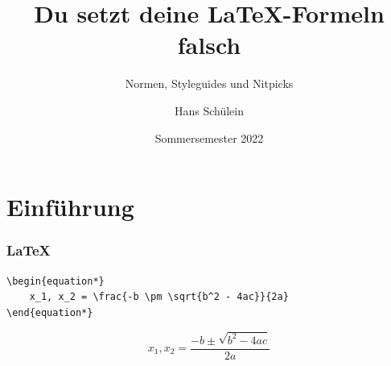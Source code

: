 \documentclass[handout]{beamer}
\begin{document}
\title{Du setzt deine \LaTeX-Formeln falsch}
\subtitle{Normen, Styleguides und Nitpicks}
\author{Hans Schülein}
\date{Sommersemester 2022}

\begin{frame}[fragile]
    \titlepage
\end{frame}

\section{Einführung}

\begin{frame}[fragile]
    \frametitle{\LaTeX}
    \begin{lstlisting}
\begin{equation*}
    x_1, x_2 = \frac{-b \pm \sqrt{b^2 - 4ac}}{2a}
\end{equation*}
    \end{lstlisting}

    \begin{equation*}
        x_1, x_2 = \frac{-b \pm \sqrt{b^2 - 4ac}}{2a}
    \end{equation*}
\end{frame}
\end{document}
